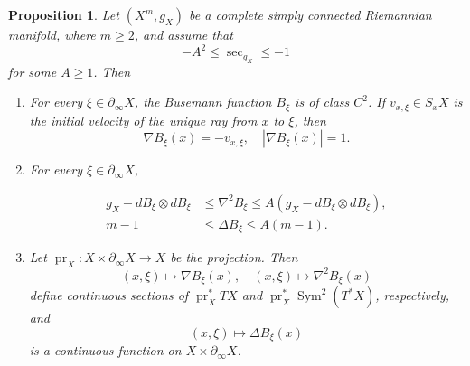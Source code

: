 \documentclass[12pt]{amsart}
\newtheorem{proposition}[theorem]{Proposition}
\theoremstyle{definition}
\numberwithin{equation}{section}
\begin{document}
\begin{proposition}
\label{prop:busemann-comparison}
Let \((X^m,g_X)\) be a complete simply connected Riemannian manifold,
where \(m\geq2\), and assume that
\[
  -A^2\leq\sec_{g_X}\leq-1
\]
for some \(A\geq1\).
Then 
\begin{enumerate}[label=\textup{(\roman*)}]
\item For every \(\xi\in\partial_\infty X\), the Busemann function
  \(B_\xi\) is of class \(C^2\).  If \(v_{x,\xi}\in S_xX\) is the initial
  velocity of the unique ray from \(x\) to \(\xi\), then
  \begin{equation}\label{eq:unit-busemann-gradient}
    \nabla B_\xi(x)=-v_{x,\xi},
    \quad
    |\nabla B_\xi(x)|=1.
  \end{equation}

\item For every \(\xi\in\partial_\infty X\),
  \addtocounter{equation}{1}
  \begin{equation}\label{eq:busemann-laplacian-comparison}
    \begin{aligned}
      g_X-dB_\xi\otimes dB_\xi
      &\leq\nabla^2B_\xi
      \leq A(g_X-dB_\xi\otimes dB_\xi),\\
      m-1&\leq\Delta B_\xi\leq A(m-1).
    \end{aligned}
  \end{equation}

\item Let \(\operatorname{pr}_X\colon
  X\times\partial_\infty X\to X\) be the projection.  Then
  \[
    (x,\xi)\longmapsto\nabla B_\xi(x),
    \quad
    (x,\xi)\longmapsto\nabla^2B_\xi(x)
  \]
  define continuous sections of
  \(\operatorname{pr}_X^*TX\) and
  \(\operatorname{pr}_X^*\operatorname{Sym}^2(T^*X)\), respectively, and
  \[
    (x,\xi)\longmapsto\Delta B_\xi(x)
  \]
  is a continuous function on \(X\times\partial_\infty X\).
\end{enumerate}
\end{proposition}
\end{document}
